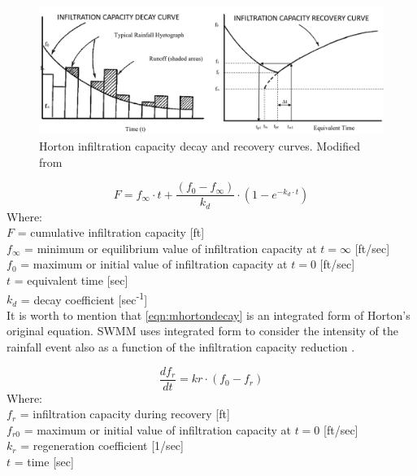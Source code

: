 \begin{figure}[h]
    \centering
	\includegraphics[scale=0.45]{figures/hortoncurves.png}
	\caption{Horton infiltration capacity decay and recovery curves. Modified from \cite{Rossman2016}}
	\label{fig:horton}
\end{figure}

\begin{equation}
\label{eqn:mhortondecay}
F = f_\infty \cdot t + \frac{(f_0 - f_\infty)}{k_d} \cdot (1 - e^{-k_d\cdot t})
\end{equation}
Where: \\
\indent $F$ = cumulative infiltration capacity [ft] \\
\indent $f_\infty$ = minimum or equilibrium value of infiltration capacity at $t = \infty$  [ft/sec] \\
\indent $f_0$ = maximum or initial value of infiltration capacity at $t = 0$ [ft/sec] \\
\indent $t$ = equivalent time [sec] \\
\indent $k_d$ = decay coefficient [sec\textsuperscript{-1}] \\

It is worth to mention that \ref{eqn:mhortondecay} is an integrated form of Horton's original equation. SWMM uses integrated form to consider the intensity of the rainfall event also as a function of the infiltration capacity reduction \cite{Rossman2016}. 


\begin{equation}
\label{eqn:mhortonrecovery}
\frac{df_r}{dt} = kr \cdot (f_0 - f_r) 
\end{equation}
Where: \\

\indent $f_r$ = infiltration capacity during recovery [ft] \\
\indent $f_{r0}$ = maximum or initial value of infiltration capacity at $t = 0$ [ft/sec] \\
\indent $k_r$ = regeneration coefficient [1/sec] \\
\indent $t$ = time [sec] \\

